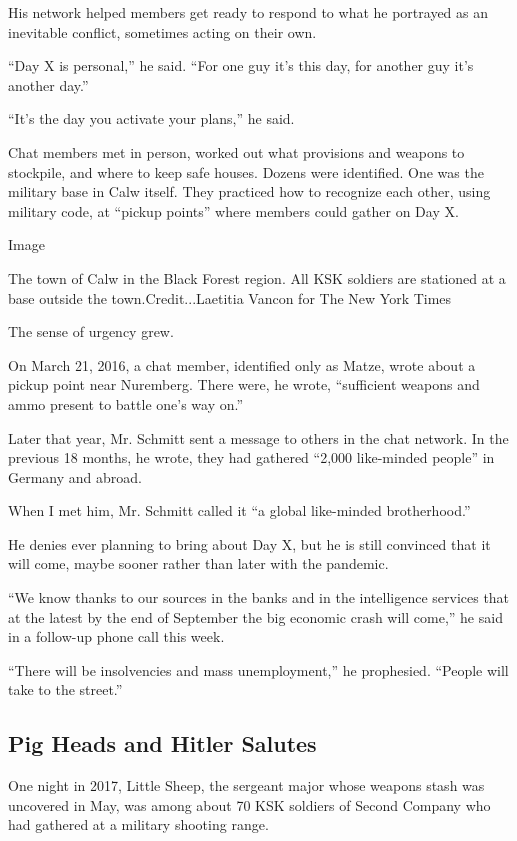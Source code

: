 His network helped members get ready to respond to what he portrayed as
an inevitable conflict, sometimes acting on their own.

``Day X is personal,'' he said. ``For one guy it's this day, for another
guy it's another day.''

``It's the day you activate your plans,'' he said.

Chat members met in person, worked out what provisions and weapons to
stockpile, and where to keep safe houses. Dozens were identified. One
was the military base in Calw itself. They practiced how to recognize
each other, using military code, at ``pickup points'' where members
could gather on Day X.

Image

The town of Calw in the Black Forest region. All KSK soldiers are
stationed at a base outside the town.Credit...Laetitia Vancon for The
New York Times

The sense of urgency grew.

On March 21, 2016, a chat member, identified only as Matze, wrote about
a pickup point near Nuremberg. There were, he wrote, ``sufficient
weapons and ammo present to battle one's way on.''

Later that year, Mr. Schmitt sent a message to others in the chat
network. In the previous 18 months, he wrote, they had gathered ``2,000
like-minded people'' in Germany and abroad.

When I met him, Mr. Schmitt called it ``a global like-minded
brotherhood.''

He denies ever planning to bring about Day X, but he is still convinced
that it will come, maybe sooner rather than later with the pandemic.

``We know thanks to our sources in the banks and in the intelligence
services that at the latest by the end of September the big economic
crash will come,'' he said in a follow-up phone call this week.

``There will be insolvencies and mass unemployment,'' he prophesied.
``People will take to the street.''

\hypertarget{pig-heads-and-hitler-salutes}{%
\subsection{Pig Heads and Hitler
Salutes}\label{pig-heads-and-hitler-salutes}}

One night in 2017, Little Sheep, the sergeant major whose weapons stash
was uncovered in May, was among about 70 KSK soldiers of Second Company
who had gathered at a military shooting range.

